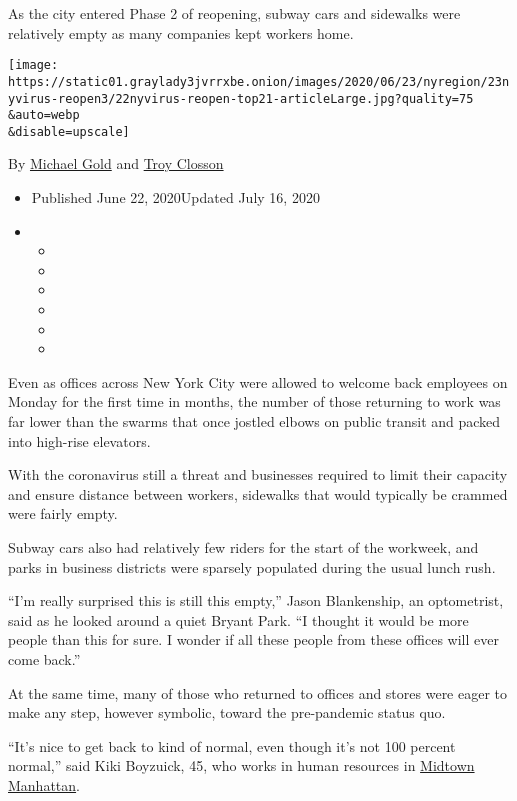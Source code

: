 As the city entered Phase 2 of reopening, subway cars and sidewalks were
relatively empty as many companies kept workers home.

\texttt{[image: https://static01.graylady3jvrrxbe.onion/images/2020/06/23/nyregion/23nyvirus-reopen3/22nyvirus-reopen-top21-articleLarge.jpg?quality=75\\\&auto=webp\\\&disable=upscale]}

By \href{https://www.nytimes3xbfgragh.onion/by/michael-gold}{Michael
Gold} and \href{https://www.nytimes3xbfgragh.onion/by/troy-closson}{Troy
Closson}

\begin{itemize}
\item
  Published June 22, 2020Updated July 16, 2020
\item
  \begin{itemize}
  \item
  \item
  \item
  \item
  \item
  \item
  \end{itemize}
\end{itemize}

Even as offices across New York City were allowed to welcome back
employees on Monday for the first time in months, the number of those
returning to work was far lower than the swarms that once jostled elbows
on public transit and packed into high-rise elevators.

With the coronavirus still a threat and businesses required to limit
their capacity and ensure distance between workers, sidewalks that would
typically be crammed were fairly empty.

Subway cars also had relatively few riders for the start of the
workweek, and parks in business districts were sparsely populated during
the usual lunch rush.

``I'm really surprised this is still this empty,'' Jason Blankenship, an
optometrist, said as he looked around a quiet Bryant Park. ``I thought
it would be more people than this for sure. I wonder if all these people
from these offices will ever come back.''

At the same time, many of those who returned to offices and stores were
eager to make any step, however symbolic, toward the pre-pandemic status
quo.

``It's nice to get back to kind of normal, even though it's not 100
percent normal,'' said Kiki Boyzuick, 45, who works in human resources
in
\href{https://www.nytimes3xbfgragh.onion/2020/07/26/nyregion/nyc-coronavirus-time-life-building.html}{Midtown
Manhattan}.

